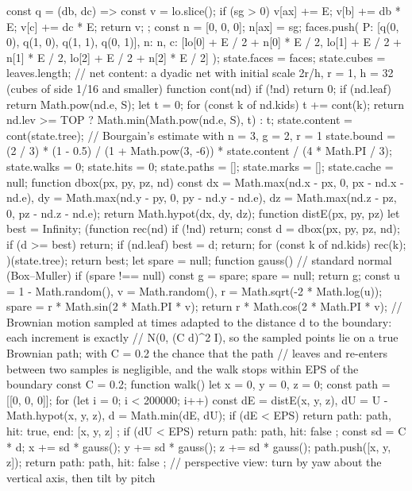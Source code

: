 \begin{js}
{{    const q = (db, dc) => { const v = lo.slice(); if (sg > 0) v[ax] += E; v[b] += db * E; v[c] += dc * E; return v; };
    const n = [0, 0, 0]; n[ax] = sg;
    faces.push({ P: [q(0, 0), q(1, 0), q(1, 1), q(0, 1)], n: n, c: [lo[0] + E / 2 + n[0] * E / 2, lo[1] + E / 2 + n[1] * E / 2, lo[2] + E / 2 + n[2] * E / 2] });
  }
  state.faces = faces; state.cubes = leaves.length;
  // net content: a dyadic net with initial scale 2r/h, r = 1, h = 32 (cubes of side 1/16 and smaller)
  function cont(nd) {
    if (!nd) return 0;
    if (nd.leaf) return Math.pow(nd.e, S);
    let t = 0; for (const k of nd.kids) t += cont(k);
    return nd.lev >= TOP ? Math.min(Math.pow(nd.e, S), t) : t;
  }
  state.content = cont(state.tree);
  // Bourgain's estimate with n = 3, g = 2, r = 1
  state.bound = (2 / 3) * (1 - 0.5) / (1 + Math.pow(3, -6)) * state.content / (4 * Math.PI / 3);
  state.walks = 0; state.hits = 0; state.paths = []; state.marks = []; state.cache = null;
}
function dbox(px, py, pz, nd) {
  const dx = Math.max(nd.x - px, 0, px - nd.x - nd.e), dy = Math.max(nd.y - py, 0, py - nd.y - nd.e), dz = Math.max(nd.z - pz, 0, pz - nd.z - nd.e);
  return Math.hypot(dx, dy, dz);
}
function distE(px, py, pz) {
  let best = Infinity;
  (function rec(nd) { if (!nd) return; const d = dbox(px, py, pz, nd); if (d >= best) return; if (nd.leaf) { best = d; return; } for (const k of nd.kids) rec(k); })(state.tree);
  return best;
}
let spare = null;
function gauss() {                                          // standard normal (Box–Muller)
  if (spare !== null) { const g = spare; spare = null; return g; }
  const u = 1 - Math.random(), v = Math.random(), r = Math.sqrt(-2 * Math.log(u));
  spare = r * Math.sin(2 * Math.PI * v); return r * Math.cos(2 * Math.PI * v);
}
// Brownian motion sampled at times adapted to the distance d to the boundary: each increment is exactly
// N(0, (C d)^2 I), so the sampled points lie on a true Brownian path; with C = 0.2 the chance that the path
// leaves and re-enters between two samples is negligible, and the walk stops within EPS of the boundary
const C = 0.2;
function walk() {
  let x = 0, y = 0, z = 0; const path = [[0, 0, 0]];
  for (let i = 0; i < 200000; i++) {
    const dE = distE(x, y, z), dU = U - Math.hypot(x, y, z), d = Math.min(dE, dU);
    if (dE < EPS) return { path: path, hit: true, end: [x, y, z] };
    if (dU < EPS) return { path: path, hit: false };
    const sd = C * d; x += sd * gauss(); y += sd * gauss(); z += sd * gauss(); path.push([x, y, z]);
  }
  return { path: path, hit: false };
}
// perspective view: turn by yaw about the vertical axis, then tilt by pitch

\end{js}
